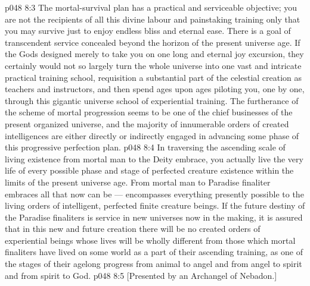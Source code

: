 \vs p048 8:3 The mortal\hyp{}survival plan has a practical and serviceable objective; you are not the recipients of all this divine labour and painstaking training only that you may survive just to enjoy endless bliss and eternal ease. There is a goal of transcendent service concealed beyond the horizon of the present universe age. If the Gods designed merely to take you on one long and eternal joy excursion, they certainly would not so largely turn the whole universe into one vast and intricate practical training school, requisition a substantial part of the celestial creation as teachers and instructors, and then spend ages upon ages piloting you, one by one, through this gigantic universe school of experiential training. The furtherance of the scheme of mortal progression seems to be one of the chief businesses of the present organized universe, and the majority of innumerable orders of created intelligences are either directly or indirectly engaged in advancing some phase of this progressive perfection plan.
\vs p048 8:4 In traversing the ascending scale of living existence from mortal man to the Deity embrace, you actually live the very life of every possible phase and stage of perfected creature existence within the limits of the present universe age. From mortal man to Paradise finaliter embraces all that now can be --- encompasses everything presently possible to the living orders of intelligent, perfected finite creature beings. If the future destiny of the Paradise finaliters is service in new universes now in the making, it is assured that in this new and future creation there will be no created orders of experiential beings whose lives will be wholly different from those which mortal finaliters have lived on some world as a part of their ascending training, as one of the stages of their agelong progress from animal to angel and from angel to spirit and from spirit to God.
\vsetoff
\vs p048 8:5 [Presented by an Archangel of Nebadon.]
\quizlink
